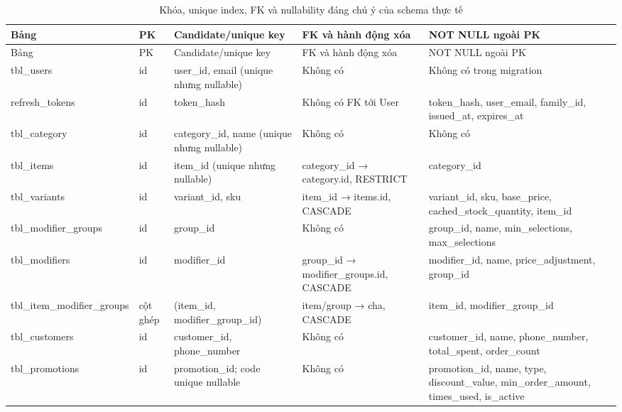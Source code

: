 \documentclass[12pt,a4paper,oneside]{report}
\begin{document}
\small\begin{longtable}{@{}D{2.2cm}D{1.2cm}D{3.1cm}D{4.1cm}D{4.1cm}@{}}
\caption{Khóa, unique index, FK và nullability đáng chú ý của schema thực tế}\\
\toprule Bảng & PK & Candidate/unique key & FK và hành động xóa & NOT NULL ngoài PK\\\midrule
\endfirsthead
\toprule Bảng & PK & Candidate/unique key & FK và hành động xóa & NOT NULL ngoài PK\\\midrule
\endhead
\bottomrule\endfoot
tbl\_\allowbreak users & id & user\_\allowbreak id, email (unique nhưng nullable) & Không có & Không có trong migration\\
refresh\_\allowbreak tokens & id & token\_\allowbreak hash & Không có FK tới User & token\_\allowbreak hash, user\_\allowbreak email, family\_\allowbreak id, issued\_\allowbreak at, expires\_\allowbreak at\\
tbl\_\allowbreak category & id & category\_\allowbreak id, name (unique nhưng nullable) & Không có & Không có\\
tbl\_\allowbreak items & id & item\_\allowbreak id (unique nhưng nullable) & category\_\allowbreak id → category.id, RESTRICT & category\_\allowbreak id\\
tbl\_\allowbreak variants & id & variant\_\allowbreak id, sku & item\_\allowbreak id → items.id, CASCADE & variant\_\allowbreak id, sku, base\_\allowbreak price, cached\_\allowbreak stock\_\allowbreak quantity, item\_\allowbreak id\\
tbl\_\allowbreak modifier\_\allowbreak groups & id & group\_\allowbreak id & Không có & group\_\allowbreak id, name, min\_\allowbreak selections, max\_\allowbreak selections\\
tbl\_\allowbreak modifiers & id & modifier\_\allowbreak id & group\_\allowbreak id → modifier\_\allowbreak groups.id, CASCADE & modifier\_\allowbreak id, name, price\_\allowbreak adjustment, group\_\allowbreak id\\
tbl\_\allowbreak item\_\allowbreak modifier\_\allowbreak groups & cột ghép & (item\_\allowbreak id, modifier\_\allowbreak group\_\allowbreak id) & item/group → cha, CASCADE & item\_\allowbreak id, modifier\_\allowbreak group\_\allowbreak id\\
tbl\_\allowbreak customers & id & customer\_\allowbreak id, phone\_\allowbreak number & Không có & customer\_\allowbreak id, name, phone\_\allowbreak number, total\_\allowbreak spent, order\_\allowbreak count\\
tbl\_\allowbreak promotions & id & promotion\_\allowbreak id; code unique nullable & Không có & promotion\_\allowbreak id, name, type, discount\_\allowbreak value, min\_\allowbreak order\_\allowbreak amount, times\_\allowbreak used, is\_\allowbreak active\\

\end{longtable}
\end{document}
